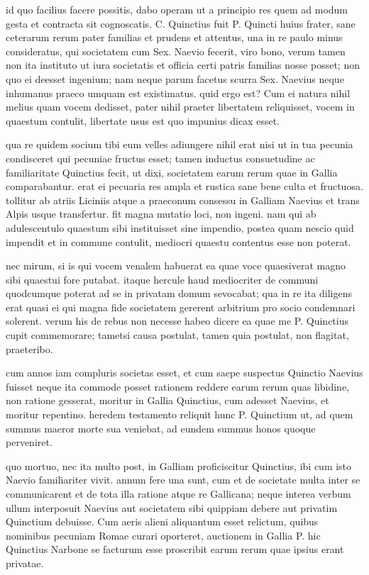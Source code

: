  id quo facilius facere possitis, dabo operam ut a principio res quem ad modum gesta et contracta sit cognoscatis. C. Quinctius fuit P. Quincti huius frater, sane ceterarum rerum pater familias et prudens et attentus, una in re paulo minus consideratus, qui societatem cum Sex. Naevio fecerit, viro bono, verum tamen non ita instituto ut iura societatis et officia certi patris familias nosse posset; non quo ei deesset ingenium; nam neque parum facetus scurra Sex. Naevius neque inhumanus praeco umquam est existimatus. quid ergo est? Cum ei natura nihil melius quam vocem dedisset, pater nihil praeter libertatem reliquisset, vocem in quaestum contulit, libertate usus est quo impunius dicax esset.

 qua re quidem socium tibi eum velles adiungere nihil erat nisi ut in tua pecunia condisceret qui pecuniae fructus esset; tamen inductus consuetudine ac familiaritate Quinctius fecit, ut dixi, societatem earum rerum quae in Gallia comparabantur. erat ei pecuaria res ampla et rustica sane bene culta et fructuosa. tollitur ab atriis Liciniis atque a praeconum consessu in Galliam Naevius et trans Alpis usque transfertur. fit magna mutatio loci, non ingeni. nam qui ab adulescentulo quaestum sibi instituisset sine impendio, postea quam nescio quid impendit et in commune contulit, mediocri quaestu contentus esse non poterat.

 nec mirum, si is qui vocem venalem habuerat ea quae voce quaesiverat magno sibi quaestui fore putabat. itaque hercule haud mediocriter de communi quodcumque poterat ad se in privatam domum sevocabat; qua in re ita diligens erat quasi ei qui magna fide societatem gererent arbitrium pro socio condemnari solerent. verum his de rebus non necesse habeo dicere ea quae me P. Quinctius cupit commemorare; tametsi causa postulat, tamen quia postulat, non flagitat, praeteribo.

 cum annos iam compluris societas esset, et cum saepe suspectus Quinctio Naevius fuisset neque ita commode posset rationem reddere earum rerum quas libidine, non ratione gesserat, moritur in Gallia Quinctius, cum adesset Naevius, et moritur repentino. heredem testamento reliquit hunc P. Quinctium ut, ad quem summus maeror morte sua veniebat, ad eundem summus honos quoque perveniret.

 quo mortuo, nec ita multo post, in Galliam proficiscitur Quinctius, ibi cum isto Naevio familiariter vivit. annum fere una sunt, cum et de societate multa inter se communicarent et de tota illa ratione atque re Gallicana; neque interea verbum ullum interposuit Naevius aut societatem sibi quippiam debere aut privatim Quinctium debuisse. Cum aeris alieni aliquantum esset relictum, quibus nominibus pecuniam Romae curari oporteret, auctionem in Gallia P. hic Quinctius Narbone se facturum esse proscribit earum rerum quae ipsius erant privatae.

